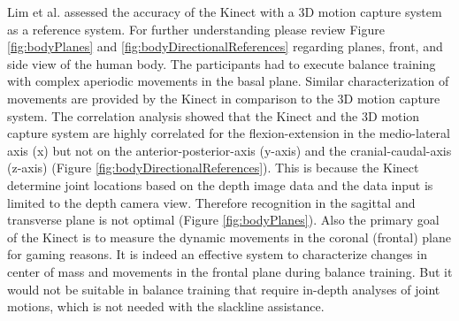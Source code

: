 Lim et al. \cite{Lim2015-pw} assessed the accuracy of the Kinect with a 3D motion capture system as a reference system. For further understanding please review Figure \ref{fig:bodyPlanes} and \ref{fig:bodyDirectionalReferences} regarding planes, front, and side view of the human body. The participants had to execute balance training with complex aperiodic movements in the basal plane. Similar characterization of movements are provided by the Kinect in comparison to the 3D motion capture system. The correlation analysis showed that the Kinect and the 3D motion capture system are highly correlated for the flexion-extension in the medio-lateral axis (x) but not on the anterior-posterior-axis (y-axis) and the cranial-caudal-axis (z-axis) (Figure \ref{fig:bodyDirectionalReferences}). This is because the Kinect determine joint locations based on the depth image data and the data input is limited to the depth camera view. Therefore recognition in the sagittal and transverse plane is not optimal (Figure \ref{fig:bodyPlanes}). Also the primary goal of the Kinect is to measure the dynamic movements in the coronal (frontal) plane for gaming reasons. It is indeed an effective system to characterize changes in center of mass and movements in the frontal plane during balance training. But it would not be suitable in balance training that require in-depth analyses of joint motions, which is not needed with the slackline assistance.


